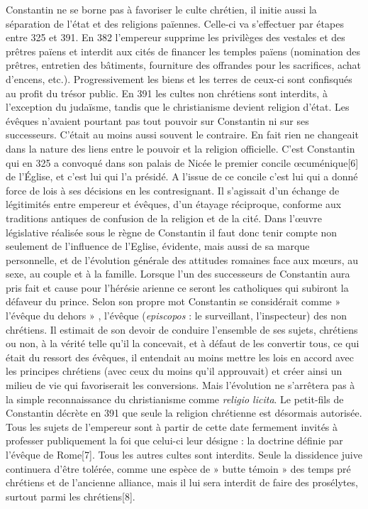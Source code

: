  Constantin ne se borne pas à favoriser le culte chrétien, il initie aussi la séparation de l'état et des religions païennes. Celle-ci va s'effectuer par étapes entre 325 et 391. En 382 l'empereur supprime les privilèges des vestales et des prêtres païens et interdit aux cités de financer les temples païens (nomination des prêtres, entretien des bâtiments, fourniture des offrandes pour les sacrifices, achat d'encens, etc.). Progressivement les biens et les terres de ceux-ci sont confisqués au profit du trésor public. En 391 les cultes non chrétiens sont interdits, à l'exception du judaïsme, tandis que le christianisme devient religion d'état. 
 Les évêques n'avaient pourtant pas tout pouvoir sur Constantin ni sur ses successeurs. C'était au moins aussi souvent le contraire. En fait rien ne changeait dans la nature des liens entre le pouvoir et la religion officielle. C'est Constantin qui en 325 a convoqué dans son palais de Nicée le premier concile œcuménique[6] de l'Église, et c'est lui qui l'a présidé. A l'issue de ce concile c'est lui qui a donné force de lois à ses décisions en les contresignant. Il s'agissait d'un échange de légitimités entre empereur et évêques, d'un étayage réciproque, conforme aux traditions antiques de confusion de la religion et de la cité. Dans l'œuvre législative réalisée sous le règne de Constantin il faut donc tenir compte non seulement de l'influence de l'Eglise, évidente, mais aussi de sa marque personnelle, et de l'évolution générale des attitudes romaines face aux mœurs, au sexe, au couple et à la famille. Lorsque l'un des successeurs de Constantin aura pris fait et cause pour l'hérésie arienne ce seront les catholiques qui subiront la défaveur du prince.
 Selon son propre mot Constantin se considérait comme » l'évêque du dehors » , l'évêque (\emph{episcopos} : le surveillant, l'inspecteur) des non chrétiens. Il estimait de son devoir de conduire l'ensemble de ses sujets, chrétiens ou non, à la vérité telle qu'il la concevait, et à défaut de les convertir tous, ce qui était du ressort des évêques, il entendait au moins mettre les lois en accord avec les principes chrétiens (avec ceux du moins qu'il approuvait) et créer ainsi un milieu de vie qui favoriserait les conversions.
 Mais l'évolution ne s'arrêtera pas à la simple reconnaissance du christianisme comme \emph{religio licita}. Le petit-fils de Constantin décrète en 391 que seule la religion chrétienne est désormais autorisée. Tous les sujets de l'empereur sont à partir de cette date fermement invités à professer publiquement la foi que celui-ci leur désigne : la doctrine définie par l'évêque de Rome[7]. Tous les autres cultes sont interdits. Seule la dissidence juive continuera d'être tolérée, comme une espèce de » butte témoin » des temps pré chrétiens et de l'ancienne alliance, mais il lui sera interdit de faire des prosélytes, surtout parmi les chrétiens[8]. 

